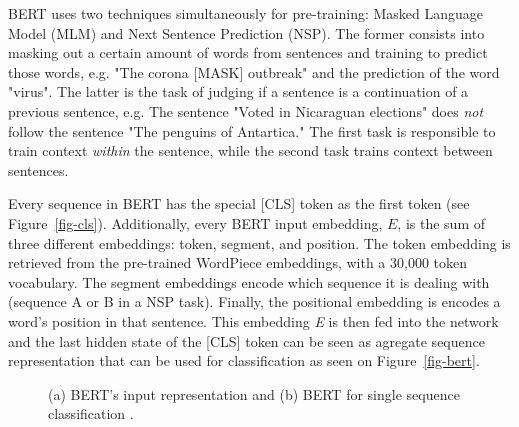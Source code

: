 BERT uses two techniques simultaneously for pre-training: Masked Language Model (MLM) and Next Sentence Prediction (NSP). The former consists into masking out a certain amount of words from sentences and training to predict those words, e.g. "The corona [MASK] outbreak" and the prediction of the word "virus". The latter is the task of judging if a sentence is a continuation of a previous sentence, e.g. The sentence "Voted in Nicaraguan elections" does \textit{not} follow the sentence "The penguins of Antartica." The first task is responsible to train context \textit{within} the sentence, while the second task trains context between sentences.

Every sequence in BERT has the special [CLS] token as the first token (see Figure~\ref{fig-cls}). Additionally, every BERT input embedding, $\mathit{E}$, is the sum of three different embeddings: token, segment, and position. The token embedding is retrieved from the pre-trained WordPiece embeddings, with a 30,000 token vocabulary. The segment embeddings encode which sequence it is dealing with (sequence A or B in a NSP task). Finally, the positional embedding is encodes a word's position in that sentence. This embedding \textit{E} is then fed into the network and the last hidden state of the [CLS] token can be seen as agregate sequence representation that can be used for classification \citep{devlin2019bert} as seen on Figure~\ref{fig-bert}.

\begin{figure}[!h]
	\centering
	\hfill
	\caption{(a) BERT's input representation and (b) BERT for single sequence classification \citep{devlin2019bert}.}
\end{figure}



